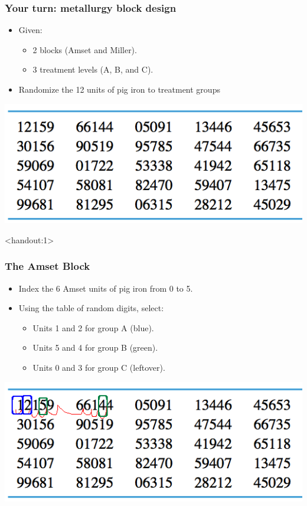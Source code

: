 \documentclass[handout]{beamer}\usepackage{graphicx, color}
\newcommand{\answers}{1}
\numberwithin{equation}{section}
\begin{document}
\begin{frame}
\frametitle{Your turn: metallurgy block design}

\begin{itemize}
\item Given:
\begin{itemize}
\item 2 blocks (Amset and Miller).
\item 3 treatment levels (A, B, and C).
\end{itemize}
\item Randomize the 12 units of pig iron to treatment groups
\end{itemize}

\begin{center}
 \includegraphics{../../fig/rdigitsshort.png}
\end{center}
\end{frame}


\begin{frame}<handout:\answers>
\frametitle{The Amset Block}

\begin{itemize}
 \item Index the 6 Amset units of pig iron from 0 to 5.
\pause \item Using the table of random digits, select:
\begin{itemize}
\pause \item Units 1 and 2 for group A (blue).
\pause \item Units 5 and 4 for group B (green).
\pause \item Units 0 and 3 for group C (leftover).
\end{itemize}
\end{itemize}

\begin{center}
 \includegraphics{../../fig/rdigitsshortAmset.png}
\end{center}

\end{frame}
\end{document}
